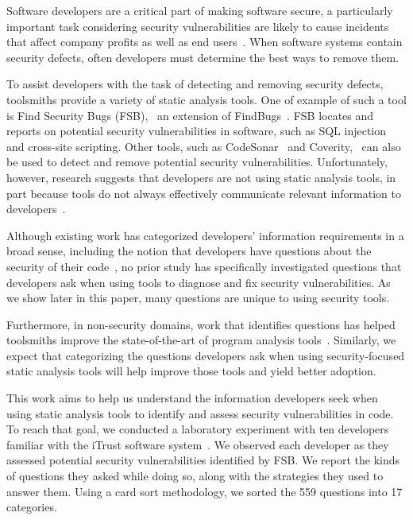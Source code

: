 \documentclass{acm_proc_article-sp}
\begin{document}
Software developers are a critical part of making software secure, a particularly important task considering security vulnerabilities are likely to cause incidents that affect company profits as well as end users~\cite{chen2002mops}.
When software systems contain security defects, often developers must determine the best ways to remove them. 

To assist developers with the task of detecting and removing security defects, toolsmiths provide a variety of static analysis tools.
One of example of such a tool is Find Security Bugs (FSB),~\cite{FindSecurityBugs} an extension of FindBugs~\cite{FindBugs}.
FSB locates and reports on potential security vulnerabilities in software, such as SQL injection and cross-site scripting.  
Other tools, such as CodeSonar~\cite{CodeSonar} and Coverity,~\cite{Coverity} can also be used to detect and remove potential security vulnerabilities.
Unfortunately, however, research suggests that developers are not using static analysis tools, in part because tools do not always effectively communicate relevant information to developers~\cite{johnson2013don}. 


Although existing work has categorized developers' information requirements in a broad sense, including the notion that developers have questions about the security of their code~\cite{latoza2010hard}, no prior study has specifically investigated questions that developers ask when using tools to diagnose and fix security vulnerabilities. 
As we show later in this paper, many questions are unique to using security tools.

Furthermore, in non-security domains, work that identifies questions has helped toolsmiths improve the state-of-the-art of program analysis tools~\cite{kononenko2012automatically, servant2012history, yoon2013visualization}. Similarly, we expect that categorizing the questions developers ask when using security-focused static analysis tools will help improve those tools and yield better adoption. 





This work aims to help us understand the information developers seek when using static analysis tools to identify and assess security vulnerabilities in code.
To reach that goal, we conducted a laboratory experiment with ten developers familiar with the iTrust software system~\cite{iTrust}.
We observed each developer as they assessed potential security vulnerabilities identified by FSB. 
We report the kinds of questions they asked while doing so, along with the strategies they used to answer them.
Using a card sort methodology, we sorted the 559 questions into 17 categories. 
\end{document}
